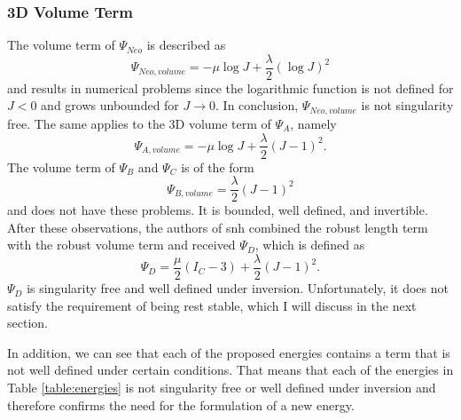 {{{\subsubsection{3D Volume Term}
The volume term of $\Psi_{Neo}$ is described as
\[
\Psi_{Neo, volume} = -\mu \log J+\frac{\lambda}{2}(\log J)^{2}
\]
and results in numerical problems since the logarithmic function is not defined for $J<0$ and grows unbounded for $J \rightarrow 0$. In conclusion, $\Psi_{Neo, volume}$ is not singularity free. 
The same applies to the 3D volume term of $\Psi_{A}$, namely
\[
\Psi_{A, volume} = -\mu \log J+\frac{\lambda}{2}(J-1)^{2}.
\]
The volume term of $\Psi_{B}$ and $\Psi_{C}$ is of the form
\[
\Psi_{B, volume} = \frac{\lambda}{2}(J-1)^{2}
\]
and does not have these problems. It is bounded, well defined, and invertible. After these observations, the authors of \acrshort{snh} combined the robust length term with the robust volume term and received $\Psi_D$, which is defined as
\[
\Psi_{D} = \frac{\mu}{2}\left(I_{C}-3\right) +\frac{\lambda}{2}(J-1)^{2}.
\]
$\Psi_{D}$ is singularity free and well defined under inversion. Unfortunately, it does not satisfy the requirement of being rest stable, which I will discuss in the next section.

In addition, we can see that each of the proposed energies contains a term that is not well defined under certain conditions. That means that each of the energies in Table \ref{table:energies} is not singularity free or well defined under inversion and therefore confirms the need for the formulation of a new energy.

}}}
